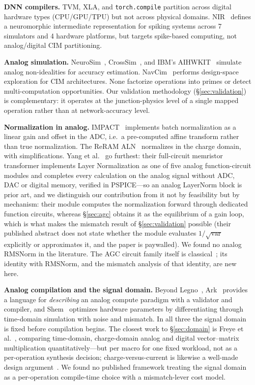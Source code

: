 \documentclass[11pt]{article}
\begin{document}
\textbf{DNN compilers.} TVM, XLA, and \texttt{torch.compile} partition across digital hardware types (CPU/GPU/TPU) but not across physical domains. NIR~\cite{nir2024} defines a neuromorphic intermediate representation for spiking systems across 7 simulators and 4 hardware platforms, but targets spike-based computing, not analog/digital CIM partitioning.

\textbf{Analog simulation.} NeuroSim~\cite{neurosim}, CrossSim~\cite{crosssim}, and IBM's AIHWKIT~\cite{aihwkit2023} simulate analog non-idealities for accuracy estimation. NavCim~\cite{navcim2024} performs design-space exploration for CIM architectures. None factorize operations into primes or detect multi-computation opportunities. Our validation methodology (\S\ref{sec:validation}) is complementary: it operates at the junction-physics level of a single mapped operation rather than at network-accuracy level.

\textbf{Normalization in analog.} IMPACT~\cite{impact2023} implements batch normalization as a linear gain and offset in the ADC, i.e.\ a pre-computed affine transform rather than true normalization. The ReRAM ALN~\cite{reram_aln2022} normalizes in the charge domain, with simplifications. Yang et al.~\cite{yang2022} go furthest: their full-circuit memristor transformer implements Layer Normalization as one of five analog function-circuit modules and completes every calculation on the analog signal without ADC, DAC or digital memory, verified in PSPICE---so an analog LayerNorm block is prior art, and we distinguish our contribution from it not by feasibility but by mechanism: their module computes the normalization forward through dedicated function circuits, whereas \S\ref{sec:agc} obtains it as the equilibrium of a gain loop, which is what makes the mismatch result of \S\ref{sec:validation} possible (their published abstract does not state whether the module evaluates $1/\sqrt{\mathrm{var}}$ explicitly or approximates it, and the paper is paywalled). We found no analog RMSNorm in the literature. The AGC circuit family itself is classical~\cite{gilbert1975,pelgrom1989}; its identity with RMSNorm, and the mismatch analysis of that identity, are new here.

\textbf{Analog compilation and the signal domain.} Beyond Legno~\cite{legno2020}, Ark~\cite{ark2024} provides a language for \textit{describing} an analog compute paradigm with a validator and compiler, and Shem~\cite{shem2024} optimizes hardware parameters by differentiating through time-domain simulation with noise and mismatch. In all three the signal domain is fixed before compilation begins. The closest work to \S\ref{sec:domain} is Freye et al.~\cite{freye2024}, comparing time-domain, charge-domain analog and digital vector--matrix multiplication quantitatively---but per macro for one fixed workload, not as a per-operation synthesis decision; charge-versus-current is likewise a well-made design argument~\cite{capram2021,valavi2019}. We found no published framework treating the signal domain as a per-operation compile-time choice with a mismatch-lever cost model.
\end{document}
